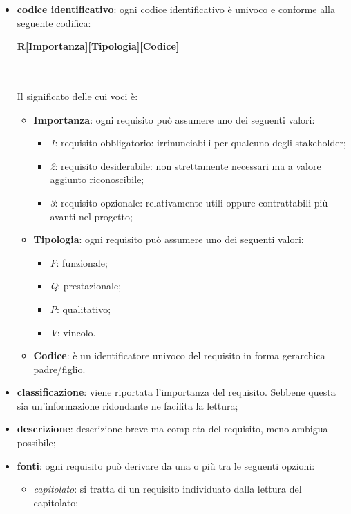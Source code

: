 			\begin{itemize}
				\item \textbf{codice identificativo}: ogni codice identificativo è univoco e conforme alla seguente codifica: \\
				\centerline{\textbf{R[Importanza][Tipologia][Codice]}} \\ \\
				Il significato delle cui voci è:
				\begin{itemize}
					\item \textbf{Importanza}: ogni requisito può assumere uno dei seguenti valori:
					\begin{itemize}
						\item \textit{1}: requisito obbligatorio: irrinunciabili per qualcuno degli stakeholder;
						\item \textit{2}: requisito desiderabile: non strettamente necessari ma  a valore aggiunto riconoscibile;
						\item \textit{3}: requisito opzionale: relativamente utili oppure contrattabili più avanti nel progetto;	
					\end{itemize}
					\item \textbf{Tipologia}: ogni requisito può assumere uno dei seguenti valori:
					\begin{itemize}
						\item \textit{F}: funzionale;
						\item \textit{Q}: prestazionale;
						\item \textit{P}: qualitativo;
						\item \textit{V}: vincolo.
					\end{itemize}
					\item \textbf{Codice}: è un identificatore univoco del requisito in forma gerarchica padre/figlio.
				\end{itemize}
				\item \textbf{classificazione}: viene riportata l'importanza del requisito. Sebbene questa sia un'informazione ridondante ne facilita la lettura;
				\item \textbf{descrizione}: descrizione breve ma completa del requisito, meno ambigua possibile;
				\item \textbf{fonti}: ogni requisito può derivare da una o più tra le seguenti opzioni:
				\begin{itemize}
					\item \textit{capitolato\glo}: si tratta di un requisito individuato dalla lettura del capitolato\glo;

\end{itemize}
\end{itemize}
